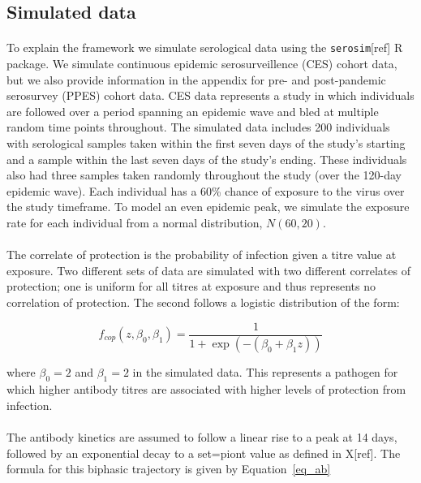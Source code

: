 \documentclass{article}
\begin{document}
\subsection{Simulated data}
\paragraph{}To explain the framework we simulate serological data using the \texttt{serosim}[ref] R package. We simulate continuous epidemic serosurveillence (CES) cohort data, but we also provide information in the appendix for pre- and post-pandemic serosurvey (PPES) cohort data. CES data represents a study in which individuals are followed over a period spanning an epidemic wave and bled at multiple random time points throughout. The simulated data includes 200 individuals with serological samples taken within the first seven days of the study's starting and a sample within the last seven days of the study's ending. These individuals also had three samples taken randomly throughout the study (over the 120-day epidemic wave). Each individual has a 60\% chance of exposure to the virus over the study timeframe. To model an even epidemic peak, we simulate the exposure rate for each individual from a normal distribution, $N(60, 20)$. 



\paragraph{}The correlate of protection is the probability of infection given a titre value at exposure. Two different sets of data are simulated with two different correlates of protection; one is uniform for all titres at exposure and thus represents no correlation of protection. The second follows a logistic distribution of the form:

\begin{equation}
\label{eq_cop}
f_{cop}(z, \beta_0, \beta_1) = \frac{1}{1 + \exp(- (\beta_0 + \beta_1z))}
\end{equation}

where $\beta_0 = 2$ and $\beta_1 = 2$ in the simulated data. This represents a pathogen for which higher antibody titres are associated with higher levels of protection from infection.

\paragraph{}The antibody kinetics are assumed to follow a linear rise to a peak at 14 days, followed by an exponential decay to a set=piont value as defined in X[ref]. The formula for this biphasic trajectory is given by Equation~\ref{eq_ab}
\end{document}
